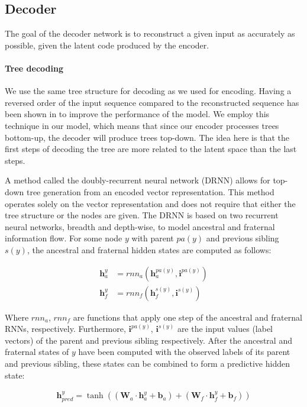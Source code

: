 \subsection{Decoder}
The goal of the decoder network is to reconstruct a given input as accurately as possible, given the latent code produced by the encoder. 

\paragraph{Tree decoding} We use the same tree structure for decoding as we used for encoding. 
Having a reversed order of the input sequence compared to the reconstructed sequence has been shown in \cite{fabius2015variational} to improve the performance of the model. 
We employ this technique in our model, which means that since our encoder processes trees bottom-up, the decoder will produce trees top-down. 
The idea here is that the first steps of decoding the tree are more related to the latent space than the last steps.



A method called the doubly-recurrent neural network (DRNN) \cite{alvarezmelis2017tree} allows for top-down tree generation from an encoded vector representation. This method operates solely on the vector representation and does not require that either the tree structure or the nodes are given. The DRNN is based on two recurrent neural networks, breadth and depth-wise, to model ancestral and fraternal information flow. For some node $y$ with parent $pa(y)$ and previous sibling $s(y)$, the ancestral and fraternal hidden states are computed as follows:

\begin{align}
    \mathbf{h}_a^y &= rnn_a(\mathbf{h}_a^{pa(y)}, \mathbf{i}^{pa(y)}) \\ \label{eq:ancestral_update}
    \mathbf{h}_f^y &= rnn_f(\mathbf{h}_f^{s(y)}, \mathbf{i}^{s(y)}) 
\end{align}

Where $rnn_a$, $rnn_f$ are functions that apply one step of the ancestral and fraternal RNNs, respectively. Furthermore, $\mathbf{i}^{pa(y)}$, $\mathbf{i}^{s(y)}$ are the input values (label vectors) of the parent and previous sibling respectively. After the ancestral and fraternal states of $y$ have been computed with the observed labels of its parent and previous sibling, these states can be combined to form a predictive hidden state:

\begin{align}
    \mathbf{h}^y_{pred} = \tanh\left((\mathbf{W}_a \cdot \mathbf{h}_a^y + \mathbf{b}_a) + (\mathbf{W}_f \cdot \mathbf{h}_f^y + \mathbf{b}_f)\right)
\end{align}

